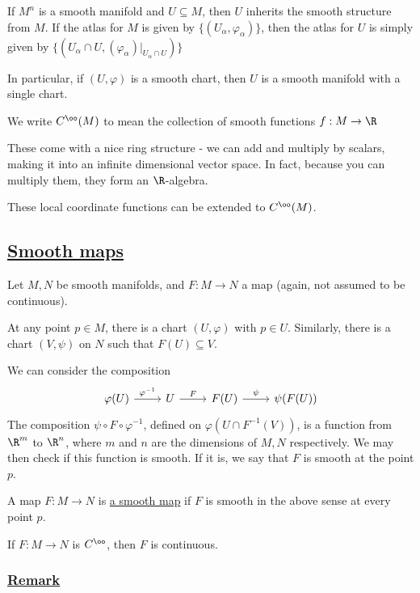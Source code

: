 \documentclass[x11names,reqno,14pt]{extarticle}
\renewcommand{\phi}{\varphi}
\begin{document}
If $M^n$ is a smooth manifold and $U\subseteq M$, then $U$ inherits the smooth structure from $M$. If the atlas for $M$ is given by $\{(U_\alpha,\phi_\alpha)\}$, then the atlas for $U$ is simply given by $\{(U_\alpha \cap U, (\phi_\alpha)|_{U_\alpha\cap U})\}$

In particular, if $(U, \phi)$ is a smooth chart, then $U$ is a smooth manifold with a single chart. 


We write $C^\oo(M)$ to mean the collection of smooth functions $f:M\to\R$

These come with a nice ring structure - we can add and multiply by scalars, making it into an infinite dimensional vector space. In fact, because you can multiply them, they form an $\R$-algebra. 


These local coordinate functions can be extended to $C^\oo(M)$. 

\subsection*{\underline{Smooth maps}}

Let $M, N$ be smooth manifolds, and $F:M\to N$ a map (again, not assumed to be continuous). 


At any point $p \in M$, there is a chart $(U, \phi)$ with $p \in U$. Similarly, there is a chart $(V,\psi)$ on $N$ such that $F(U) \subseteq V$.

We can consider the composition
\[
\begin{tikzcd}
\phi(U) \ar[r, "\phi^{-1}"] & U \ar[r, "F"] & F(U)\ar[r, "\psi"] & \psi(F(U))
\end{tikzcd}
\]
The composition $\psi\circ F \circ \phi^{-1}$, defined on $\phi(U\cap F^{-1}(V))$, is a function from $\R^m$ to $\R^n$, where $m$ and $n$ are the dimensions of $M, N$ respectively. We may then check if this function is smooth. If it is, we say that $F$ is smooth at the point $p$. 

A map $F:M\to N$ is \underline{a smooth map} if $F$ is smooth in the above sense at every point $p$. 

\lem

If $F:M\to N$ is $C^\oo$, then $F$ is continuous. 

\proof

\subsubsection*{\underline{Remark}}
\end{document}

